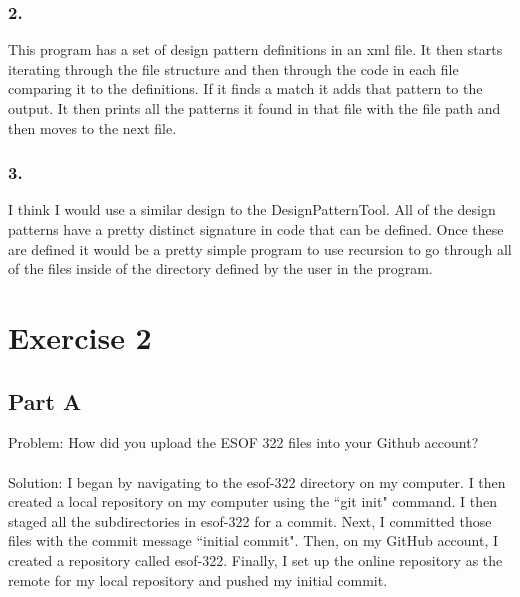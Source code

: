 \documentclass{article}
\begin{document}
\subsubsection*{2.}
This program has a set of design pattern definitions in an xml file. It then starts iterating through the file structure and then through the code in each file comparing it to the definitions. If it finds a match it adds that pattern to the output. It then prints all the patterns it found in that file with the file path and then moves to the next file. 
\subsubsection*{3.}
I think I would use a similar design to the DesignPatternTool. All of the design patterns have a pretty distinct signature in code that can be defined. Once these are defined it would be a pretty simple program to use recursion to go through all of the files inside of the directory defined by the user in the program.   


\newpage

\section*{Exercise 2}

\subsection*{Part A}
Problem: How did you upload the ESOF 322 files into your Github account? \\\\
Solution: I began by navigating to the esof-322 directory on my computer. I then created a local repository on my computer using the ``git init" command. 
I then staged all the subdirectories in esof-322 for a commit. Next, I committed those files with the commit message ``initial commit".
Then, on my GitHub account, I created a repository called esof-322.
Finally, I set up the online repository as the remote for my local repository and pushed my initial commit.
\end{document}
